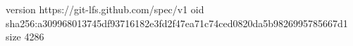 version https://git-lfs.github.com/spec/v1
oid sha256:a309968013745df93716182e3fd2f47ea71c74ced0820da5b9826995785667d1
size 4286
